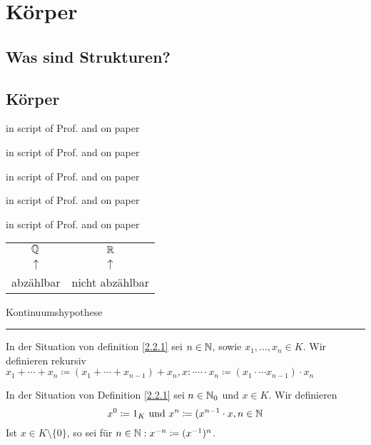 \section{Körper}
\subsection{Was sind Strukturen?}
\subsection{Körper}
\begin{subdefinition}[Körper]
	in script of Prof. and on paper
\end{subdefinition}
\begin{subexample}
	in script of Prof. and on paper
\end{subexample}
\begin{subexample}
	in script of Prof. and on paper
\end{subexample}
\begin{sublemma}
	in script of Prof. and on paper
\end{sublemma}
\begin{sublemma}
	in script of Prof. and on paper
\end{sublemma}
\begin{tabular}{cc}
	$\mathbb{Q}$ & $\mathbb{R}$\\
	$\uparrow $ & $\uparrow $\\
	abzählbar & nicht abzählbar\\
\end{tabular}
Kontinuumshypothese
\hrule
\begin{definition}
	In der Situation von definition \ref{2.2.1} sei $ n \in \mathbb{N} $, sowie $ x_1, \dotsc, x_n \in K $. Wir definieren rekursiv $ x_1 + \dotsb + x_n \coloneqq ( x_1 + \dotsb + x_{n-1} ) + x_n, x: \cdot \dotsb \cdot x_n \coloneqq ( x_1 \cdot \dotsb x_{n-1} ) \cdot x_n $
\end{definition}
\begin{definition}
	In der Situation von Definition \ref{2.2.1} sei $ n \in \mathbb{N}_0 $ und $ x \in K $. Wir definieren
	\[ x^0 \coloneqq 1_K \text{ und } x^n \coloneqq ( x^{n-1} \cdot x, n \in \mathbb{N} \]
	Ist $ x \in K\setminus\{0\} $, so sei für $ n \in \mathbb{N} : x^{-n} \coloneqq ( x^{-1})^n $.
\end{definition}
